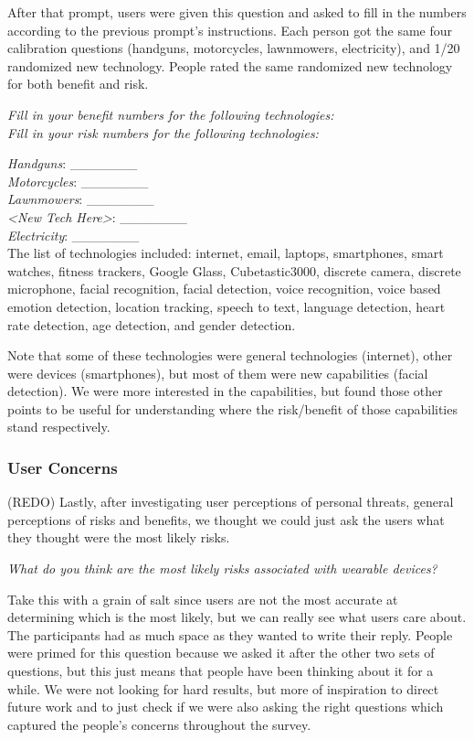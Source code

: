 \documentclass{acm_proc_article-sp}
\begin{document}
After that prompt, users were given this question and asked to fill in the numbers according to the previous prompt’s instructions. Each person got the same four calibration questions (handguns, motorcycles, lawnmowers, electricity), and 1/20 randomized new technology.  People rated the same randomized new technology for both benefit and risk.

\textit{Fill in your benefit numbers for the following technologies:}\\
\textit{Fill in your risk numbers for the following technologies:}

\textit{Handguns}: \_\_\_\_\_\_\_ \\
\textit{Motorcycles}: \_\_\_\_\_\_\_\\
\textit{Lawnmowers}: \_\_\_\_\_\_\_\\
\textit{<New Tech Here>}: \_\_\_\_\_\_\_\\
\textit{Electricity}: \_\_\_\_\_\_\_\\

The list of technologies included: internet, email, laptops, smartphones, smart watches, fitness trackers, Google Glass, Cubetastic3000, discrete camera, discrete microphone, facial recognition, facial detection, voice recognition, voice based emotion detection, location tracking, speech to text, language detection, heart rate detection, age detection, and gender detection. 

Note that some of these technologies were general technologies (internet), other were devices (smartphones), but most of them were new capabilities (facial detection). We were more interested in the capabilities, but found those other points to be useful for understanding where the risk/benefit of those capabilities stand respectively. 

\subsubsection{User Concerns}
(REDO) Lastly, after investigating user perceptions of personal threats, general perceptions of risks and benefits, we thought we could just ask the users what they thought were the most likely risks. 

\textit{What do you think are the most likely risks associated with wearable devices?}

Take this with a grain of salt since users are not the most accurate at determining which is the most likely, but we can really see what users care about. The participants had as much space as they wanted to write their reply. People were primed for this question because we asked it after the other two sets of questions, but this just means that people have been thinking about it for a while. We were not looking for hard results, but more of inspiration to direct future work and to just check if we were also asking the right questions which captured the people's concerns throughout the survey. 
\end{document}
